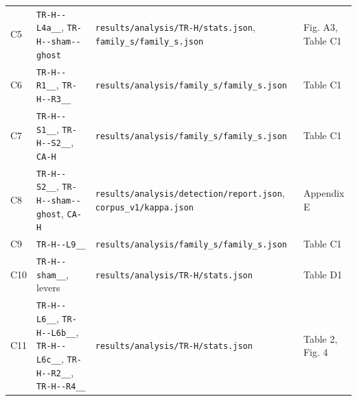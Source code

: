 \documentclass[11pt,a4paper]{article}
\begin{document}
\begin{center}
\begin{tabularx}{\linewidth}{@{}LLLL@{}}
C5 & \texttt{TR-\allowbreak{}H-\allowbreak{}-\allowbreak{}L4a\_\allowbreak{}\_\allowbreak{}}, \texttt{TR-\allowbreak{}H-\allowbreak{}-\allowbreak{}sham-\allowbreak{}-\allowbreak{}ghost} & \texttt{results/\allowbreak{}analysis/\allowbreak{}TR-\allowbreak{}H/\allowbreak{}stats.\allowbreak{}json}, \texttt{family\_\allowbreak{}s/\allowbreak{}family\_\allowbreak{}s.\allowbreak{}json} & Fig. A3, Table C1 \\
C6 & \texttt{TR-\allowbreak{}H-\allowbreak{}-\allowbreak{}R1\_\allowbreak{}\_\allowbreak{}}, \texttt{TR-\allowbreak{}H-\allowbreak{}-\allowbreak{}R3\_\allowbreak{}\_\allowbreak{}} & \texttt{results/\allowbreak{}analysis/\allowbreak{}family\_\allowbreak{}s/\allowbreak{}family\_\allowbreak{}s.\allowbreak{}json} & Table C1 \\
C7 & \texttt{TR-\allowbreak{}H-\allowbreak{}-\allowbreak{}S1\_\allowbreak{}\_\allowbreak{}}, \texttt{TR-\allowbreak{}H-\allowbreak{}-\allowbreak{}S2\_\allowbreak{}\_\allowbreak{}}, \texttt{CA-\allowbreak{}H} & \texttt{results/\allowbreak{}analysis/\allowbreak{}family\_\allowbreak{}s/\allowbreak{}family\_\allowbreak{}s.\allowbreak{}json} & Table C1 \\
C8 & \texttt{TR-\allowbreak{}H-\allowbreak{}-\allowbreak{}S2\_\allowbreak{}\_\allowbreak{}}, \texttt{TR-\allowbreak{}H-\allowbreak{}-\allowbreak{}sham-\allowbreak{}-\allowbreak{}ghost}, \texttt{CA-\allowbreak{}H} & \texttt{results/\allowbreak{}analysis/\allowbreak{}detection/\allowbreak{}report.\allowbreak{}json}, \texttt{corpus\_\allowbreak{}v1/\allowbreak{}kappa.\allowbreak{}json} & Appendix E \\
C9 & \texttt{TR-\allowbreak{}H-\allowbreak{}-\allowbreak{}L9\_\allowbreak{}\_\allowbreak{}} & \texttt{results/\allowbreak{}analysis/\allowbreak{}family\_\allowbreak{}s/\allowbreak{}family\_\allowbreak{}s.\allowbreak{}json} & Table C1 \\
C10 & \texttt{TR-\allowbreak{}H-\allowbreak{}-\allowbreak{}sham\_\allowbreak{}\_\allowbreak{}}, levers & \texttt{results/\allowbreak{}analysis/\allowbreak{}TR-\allowbreak{}H/\allowbreak{}stats.\allowbreak{}json} & Table D1 \\
C11 & \texttt{TR-\allowbreak{}H-\allowbreak{}-\allowbreak{}L6\_\allowbreak{}\_\allowbreak{}}, \texttt{TR-\allowbreak{}H-\allowbreak{}-\allowbreak{}L6b\_\allowbreak{}\_\allowbreak{}}, \texttt{TR-\allowbreak{}H-\allowbreak{}-\allowbreak{}L6c\_\allowbreak{}\_\allowbreak{}}, \texttt{TR-\allowbreak{}H-\allowbreak{}-\allowbreak{}R2\_\allowbreak{}\_\allowbreak{}}, \texttt{TR-\allowbreak{}H-\allowbreak{}-\allowbreak{}R4\_\allowbreak{}\_\allowbreak{}} & \texttt{results/\allowbreak{}analysis/\allowbreak{}TR-\allowbreak{}H/\allowbreak{}stats.\allowbreak{}json} & Table 2, Fig. 4 \\

\end{tabularx}
\end{center}
\end{document}
